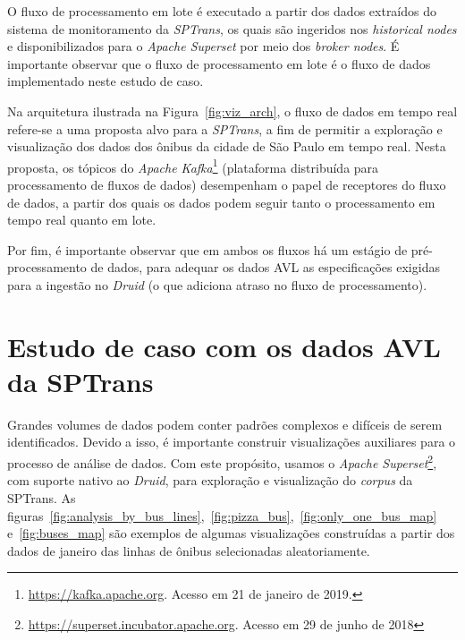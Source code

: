 \documentclass[
	12pt,				%
	oneside,			%
	a4paper,			%
	english,			%
	brazil				%
	]{abntex2ppgsi}
\begin{document}
{{O fluxo de processamento em lote é executado a partir dos dados extraídos do sistema de monitoramento da \textit{SPTrans}, os quais são ingeridos nos \textit{historical nodes} 
e disponibilizados para o \textit{Apache Superset} por meio dos \textit{broker nodes}. 
É importante observar que o fluxo de processamento em lote é o fluxo de dados implementado neste estudo de caso.

Na arquitetura ilustrada na Figura~\ref{fig:viz_arch}, o fluxo de dados em tempo real refere-se a uma proposta alvo para a \textit{SPTrans}, a fim de permitir a exploração e visualização dos dados dos ônibus da cidade de São Paulo em tempo real. Nesta proposta, os tópicos do \textit{Apache Kafka}\footnote{\url{https://kafka.apache.org}. Acesso em 21 de janeiro de 2019.} (plataforma distribuída para processamento de fluxos de dados) desempenham o papel de receptores do fluxo de dados, a partir dos quais os dados podem seguir tanto o processamento em tempo real quanto em lote.

Por fim, é importante observar que em ambos os fluxos há um estágio de pré-processamento de dados, para adequar os dados AVL as especificações exigidas para a ingestão no \textit{Druid} (o que adiciona atraso no fluxo de processamento).

\section{Estudo de caso com os dados AVL da SPTrans}
\label{viz_case}

Grandes volumes de dados podem conter padrões complexos e difíceis de serem identificados. Devido a isso, é importante construir visualizações auxiliares para o processo de análise de dados. Com este propósito, usamos o \textit{Apache Superset}\footnote{\url{https://superset.incubator.apache.org}. Acesso em 29 de junho de 2018}, com suporte nativo ao \textit{Druid}, para exploração e visualização do \textit{corpus} da SPTrans. As figuras~\ref{fig:analysis_by_bus_lines},~\ref{fig:pizza_bus},~\ref{fig:only_one_bus_map} e~\ref{fig:buses_map} são exemplos de algumas visualizações construídas a partir dos dados de janeiro das linhas de ônibus selecionadas aleatoriamente.

}}
\end{document}
